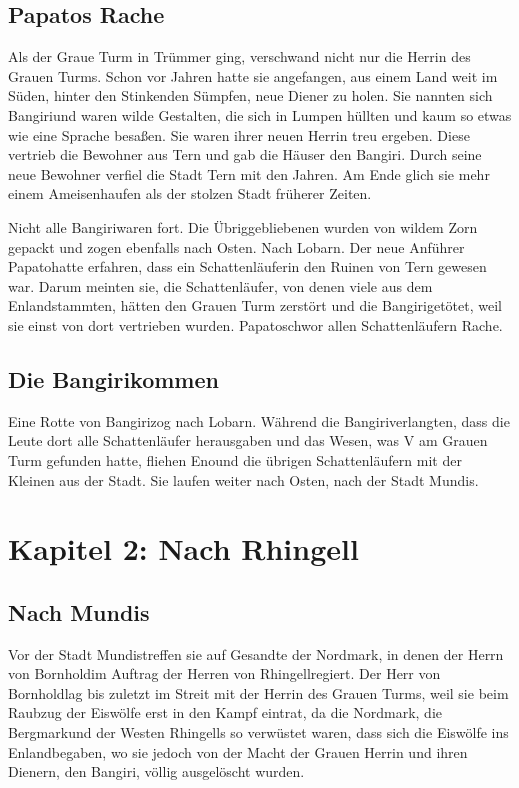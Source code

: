 \documentclass[12pt,a4paper,onecolumn,twoside,ngerman]{book}
\newcommand{\Tern}{Tern }
\newcommand{\Bangiri}{Bangiri}
\newcommand{\Papato}{Papato}
\newcommand{\Enland}{Enland}
\newcommand{\Schattenjager}{Schattenläufer}
\newcommand{\Eno}{Eno}
\newcommand{\Lobarn}{Lobarn}
\newcommand{\Nordmark}{Nordmark}
\newcommand{\Bergmark}{Bergmark}
\newcommand{\Bornhold}{Bornhold}
\newcommand{\Rhingell}{Rhingell}
\newcommand{\Mundis}{Mundis}
\begin{document}
\section{\Papato{s} Rache}

Als der Graue Turm in Trümmer ging, verschwand nicht nur die Herrin des Grauen Turms. Schon vor Jahren hatte sie angefangen, aus einem Land weit im Süden, hinter den Stinkenden Sümpfen, neue Diener zu holen. Sie nannten sich \Bangiri und waren wilde Gestalten, die sich in Lumpen hüllten und kaum so etwas wie eine Sprache besaßen. 
Sie waren ihrer neuen Herrin treu ergeben. Diese vertrieb die Bewohner aus \Tern und gab die Häuser den \Bangiri. Durch seine neue Bewohner verfiel die Stadt \Tern mit den Jahren. Am Ende glich sie mehr einem Ameisenhaufen als der stolzen Stadt früherer Zeiten.

Nicht alle \Bangiri waren fort. Die Übriggebliebenen wurden von wildem Zorn gepackt und zogen ebenfalls nach Osten. Nach \Lobarn. Der neue Anführer \Papato hatte erfahren, dass ein \Schattenjager in den Ruinen von \Tern gewesen war. Darum meinten sie, die Schattenläufer, von denen viele aus dem \Enland stammten, hätten den Grauen Turm zerstört und die \Bangiri getötet, weil sie einst von dort vertrieben wurden. \Papato schwor allen Schattenläufern Rache.

\section{Die \Bangiri kommen}
Eine Rotte von \Bangiri zog nach \Lobarn.
Während die \Bangiri verlangten, dass die Leute dort alle Schattenläufer herausgaben und das Wesen, was V am Grauen Turm gefunden hatte, fliehen \Eno und die übrigen Schattenläufern mit der Kleinen aus der Stadt. Sie laufen weiter nach Osten, nach der Stadt \Mundis.

\chapter{Kapitel 2: Nach \Rhingell}

\section{Nach \Mundis}
Vor der Stadt \Mundis treffen sie auf Gesandte der \Nordmark, in denen der Herrn von \Bornhold im Auftrag der Herren von \Rhingell regiert.
Der Herr von \Bornhold lag bis zuletzt im Streit mit der Herrin des Grauen Turms, weil sie beim Raubzug der Eiswölfe erst in den Kampf  eintrat, da die \Nordmark, die \Bergmark und der Westen \Rhingell{s} so verwüstet waren, dass sich die Eiswölfe ins \Enland begaben, wo sie jedoch von der Macht der Grauen Herrin und ihren Dienern, den \Bangiri, völlig ausgelöscht wurden. 
\end{document}
